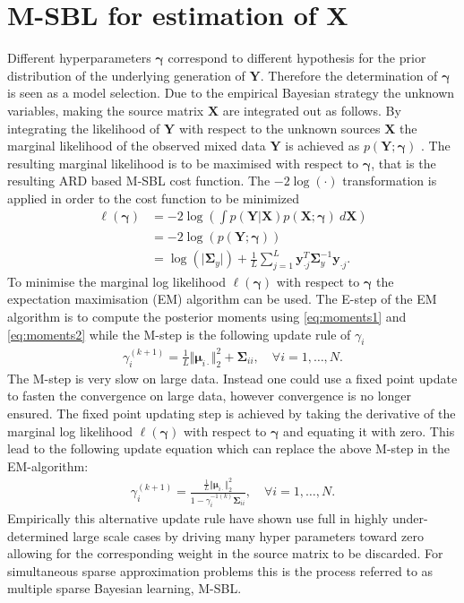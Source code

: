 \section{M-SBL for estimation of $\textbf{X}$}
Different hyperparameters $\boldsymbol{\gamma}$ correspond to different hypothesis for the prior distribution of the underlying generation of $\mathbf{Y}$. 
Therefore the determination of $\boldsymbol{\gamma}$ is seen as a model selection.
Due to the empirical Bayesian strategy the unknown variables, making the source matrix $\mathbf{X}$ are integrated out as follows.
By integrating the likelihood of $\mathbf{Y}$ with respect to the unknown sources $\mathbf{X}$ the marginal likelihood of the observed mixed data $\mathbf{Y}$ is achieved as $p (\mathbf{Y} ; \boldsymbol{\gamma})$ \cite[p. 146]{phd_wipf}. 
The resulting marginal likelihood is to be maximised with respect to $\boldsymbol{\gamma}$, that is the resulting ARD based M-SBL cost function.
The $-2 \log (\cdot)$ transformation is applied in order to the cost function to be minimized
\begin{align*}
\ell(\boldsymbol{\gamma}) &= -2 \log \left( \int p (\mathbf{Y}  \vert \mathbf{X}) p (\mathbf{X} ; \boldsymbol{\gamma}) \ d\mathbf{X} \right) \\
&= - 2 \log(p (\mathbf{Y} ; \boldsymbol{\gamma}))\\
&= \log ( \vert \boldsymbol{\Sigma}_y \vert) + \frac{1}{L} \sum_{j=1}^L \mathbf{y}_{\cdot j}^T \boldsymbol{\Sigma}_y ^{-1} \mathbf{y}_{\cdot j}.
\end{align*}
To minimise the marginal log likelihood $\ell(\boldsymbol{\gamma})$ with respect to $\boldsymbol{\gamma}$ the expectation maximisation (EM) algorithm can be used. 
The E-step of the EM algorithm is to compute the posterior moments using \eqref{eq:moments1} and \eqref{eq:moments2} while the M-step is the following update rule of $\gamma_i$ \cite[p.147]{phd_wipf}
\begin{align*}
\gamma_i^{(k+1)} = \frac{1}{L} \Vert \boldsymbol{\mu}_{i \cdot} \Vert_2^2 + \boldsymbol{\Sigma}_{ii}, \quad \forall i = 1, \dots, N.
\end{align*}
The M-step is very slow on large data. 
Instead one could use a fixed point update to fasten the convergence on large data, however convergence is no longer ensured. 
The fixed point updating step is achieved by taking the derivative of the marginal log likelihood $\ell(\boldsymbol{\gamma})$ with respect to $\boldsymbol{\gamma}$ and equating it with zero. 
This lead to the following update equation which can replace the above M-step in the EM-algorithm:
\begin{align*}
\gamma_i^{(k+1)} = \frac{\frac{1}{L} \Vert \boldsymbol{\mu}_{i \cdot} \Vert_2^2}{1 - \gamma_i^{-1 (k)} \boldsymbol{\Sigma}_{ii}}, \quad \forall i = 1, \dots, N.
\end{align*}
Empirically this alternative update rule have shown use full in highly under-determined large scale cases by driving many hyper parameters toward zero allowing for the corresponding weight in the source matrix to be discarded. 
For simultaneous sparse approximation problems this is the process referred to as multiple sparse Bayesian learning, M-SBL.

